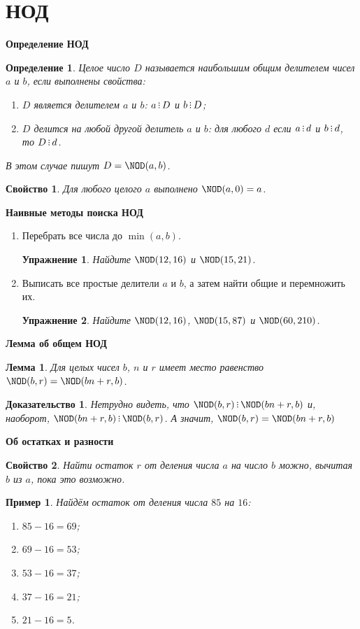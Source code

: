 \documentclass[aspectratio=1610,11pt]{beamer}
\newtheorem{Le}{Лемма}
\newtheorem{Def}{Определение}
\newtheorem{Ex}{Пример}
\newtheorem{Property}{Свойство}
\newtheorem{Prof}{Доказательство}
\newtheorem{Exer}{Упражнение}
\newcommand\fram[2]{\begin{frame}{\bf #1} #2 \end{frame}}
\def\divsby{\mathop{\rlap{.}\rlap{\raisebox{0.55ex}{.}}\raisebox{1.1ex}{.}}}
\begin{document}
\section{НОД}
\fram{Определение НОД}{
\large
\begin{Def}
Целое число $D$ называется наибольшим общим делителем чисел $a$ и $b$, если выполнены свойства:
\begin{enumerate}
\item $D$ является делителем $a$ и $b$: $a \divsby D$ и $b \divsby D$;
\item $D$ делится на любой другой делитель $a$ и $b$: для любого $d$ если $a \divsby d$ и $b \divsby d$, то $D \divsby d$.
\end{enumerate}
В этом случае пишут $D= \NOD(a, b)$.
\end{Def}
\begin{Property}
Для любого целого $a$ выполнено $\NOD(a, 0) = a$.
\end{Property}
}


\fram{Наивные методы поиска НОД}{
\large
\begin{enumerate}
\item Перебрать все числа до $\min(a, b)$.
\begin{Exer}
Найдите $\NOD (12, 16)$ и $\NOD (15, 21)$.
\end{Exer} \pause
\item Выписать все простые делители $a$ и $b$, а затем найти общие и перемножить их.
\begin{Exer}
Найдите $\NOD (12, 16)$, $\NOD (15, 87)$ и $\NOD (60, 210)$.
\end{Exer}
\end{enumerate}
}

\fram{Лемма об общем НОД}{
\large
\begin{Le}
Для целых чисел $b$, $n$ и $r$ имеет место равенство $\NOD(b,r) = \NOD(bn+r, b)$.
\end{Le}

\begin{Prof}
Нетрудно видеть, что $\NOD(b,r) \divsby \NOD(bn+r, b)$ \pause и, наоборот, $\NOD(bn+r, b) \divsby \NOD(b,r)$. \pause А значит, $\NOD(b,r) = \NOD(bn+r, b)$
\end{Prof}
}

\fram{Об остатках и разности}{
\large
\begin{Property}
Найти остаток $r$ от деления числа $a$ на число $b$ можно, вычитая $b$ из $a$, \linebreak пока это возможно.
\end{Property}

\begin{Ex}
Найдём остаток от деления числа $85$ на $16$:
\begin{enumerate}
\item $85 -16 = 69$;
\item $69 -16 = 53$;
\item $53 -16 = 37$;
\item $37 -16 = 21$;
\item $21 -16 = 5$.
\end{enumerate}
\end{Ex}
}
\end{document}
